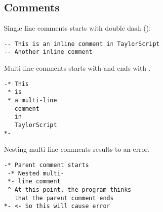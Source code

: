 \subsection{Comments}
Single line comments starts with double dash (\cd{{-}-}):
\begin{verbatim}
-- This is an inline comment in TaylorScript
-- Another inline comment
\end{verbatim}

Multi-line comments starts with \cd{-*} and ends with \cd{*-}.
\begin{verbatim}
-* This
 * is
 * a multi-line
   comment
   in
   TaylorScript
*-
\end{verbatim}

Nesting multi-line comments results to an error.
\begin{verbatim}
-* Parent comment starts
 -* Nested multi-
 *- line comment
 ^ At this point, the program thinks
   that the parent comment ends
*- <- So this will cause error
\end{verbatim}